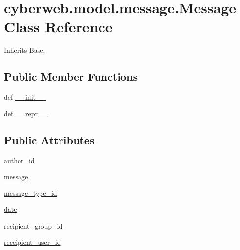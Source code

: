 \hypertarget{classcyberweb_1_1model_1_1message_1_1_message}{\section{cyberweb.\-model.\-message.\-Message \-Class \-Reference}
\label{classcyberweb_1_1model_1_1message_1_1_message}
}


\-Inherits \-Base.

\subsection*{\-Public \-Member \-Functions}
\begin{DoxyCompactItemize}
\item 
def \hyperlink{classcyberweb_1_1model_1_1message_1_1_message_aa5d1325b0daf2345cba01740290707bb}{\-\_\-\-\_\-init\-\_\-\-\_\-}
\item 
def \hyperlink{classcyberweb_1_1model_1_1message_1_1_message_ac9f1f3163434d480e60ff96ffff3eee7}{\-\_\-\-\_\-repr\-\_\-\-\_\-}
\end{DoxyCompactItemize}
\subsection*{\-Public \-Attributes}
\begin{DoxyCompactItemize}
\item 
\hyperlink{classcyberweb_1_1model_1_1message_1_1_message_adcd860a360f48b51993c5014dd97ee2c}{author\-\_\-id}
\item 
\hyperlink{classcyberweb_1_1model_1_1message_1_1_message_aed8a61c20b9e55a33e55a147d8ad2424}{message}
\item 
\hyperlink{classcyberweb_1_1model_1_1message_1_1_message_aef0d1e1f257f49eba87ec905d3da3d25}{message\-\_\-type\-\_\-id}
\item 
\hyperlink{classcyberweb_1_1model_1_1message_1_1_message_abf7caf2212499da5b2a0c1c2eba9f3de}{date}
\item 
\hyperlink{classcyberweb_1_1model_1_1message_1_1_message_abebc7bb3af50a2a7a1fcdcf13d46269d}{recipient\-\_\-group\-\_\-id}
\item 
\hyperlink{classcyberweb_1_1model_1_1message_1_1_message_a0c95cc12d552e7cbbccee078a7be0ad7}{receipient\-\_\-user\-\_\-id}
\end{DoxyCompactItemize}
